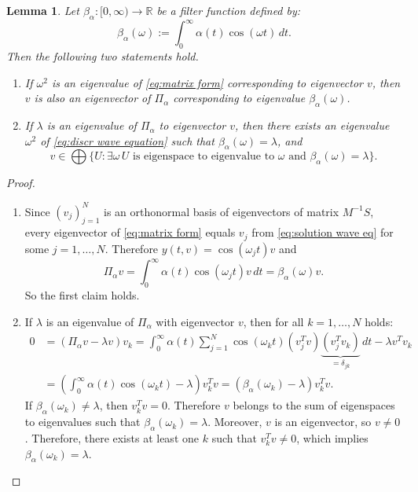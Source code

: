 \documentclass[a4paper,11pt,bibliography=totoc,listof=totoc,headinclude=true,cleardoublepage=empty,oneside]{scrbook}
\newtheorem{lemma}[theorem]{Lemma}
\newcommand{\R}{\mathbb{R}}
\begin{document}
\begin{lemma}
    Let $\beta_\alpha : [0, \infty) \rightarrow \R$ be a filter function defined by:
    \begin{equation}\label{eq:cont filter function}
        \beta_\alpha(\omega) := \int_0^\infty \alpha(t) \cos(\omega t) \,dt. 
    \end{equation}
    Then the following two statements hold.
    \begin{enumerate}
        \item If $\omega^2$ is an eigenvalue of \eqref{eq:matrix form} corresponding to eigenvector $v$, then $v$ is also an eigenvector of $\Pi_\alpha$ corresponding to eigenvalue $\beta_\alpha(\omega)$. 
        \item If $\lambda$ is an eigenvalue of $\Pi_\alpha$ to eigenvector $v$, then there exists an eigenvalue $\omega^2$ of \eqref{eq:discr wave equation} such that $\beta_\alpha (\omega) = \lambda$, and 
        \begin{equation*}
            v \in \bigoplus\{ U : \exists \omega \, U \text{ is eigenspace to eigenvalue to } \omega \text{ and } \beta_\alpha(\omega) = \lambda\}.
        \end{equation*}
    \end{enumerate}
\end{lemma}
\begin{proof}
    \begin{enumerate}
        \item Since $(v_j)_{j=1}^N$ is an orthonormal basis of eigenvectors of matrix $M^{-1}S$, every eigenvector of \eqref{eq:matrix form} equals $v_j$ from \eqref{eq:solution wave eq} for some $j=1, \dots, N$. Therefore $y(t, v) = \cos(\omega_j t)v$ and 
        \begin{equation*}
            \Pi_\alpha v = \int_0^\infty \alpha(t) \cos(\omega_j t) v \, dt = \beta_\alpha(\omega) v.
        \end{equation*}
        So the first claim holds.
        \item If $\lambda$ is an eigenvalue of $\Pi_\alpha$ with eigenvector $v$, then for all $k=1, \dots, N$ holds:
        \begin{align*}
             0 &= (\Pi_\alpha v - \lambda v)v_k = \int_0^\infty \alpha(t) \sum_{j=1}^N \cos(\omega_k t) (v_j^T v)\underbrace{(v_j^T v_k)}_{=\delta_{jk}} \, dt - \lambda v^Tv_k \\ &= \left(\int_0^\infty \alpha(t) \cos(\omega_kt) - \lambda \right)v_k^T v = (\beta_\alpha(\omega_k) - \lambda)v_k^T v.
        \end{align*}
        If $\beta_\alpha (\omega_k)\neq \lambda$, then $v_k^Tv = 0$. Therefore $v$ belongs to the sum of eigenspaces to eigenvalues such that $\beta_\alpha(\omega_k) = \lambda$. Moreover, $v$ is an eigenvector, so $v\neq 0$. Therefore, there exists at least one $k$ such that $v_k^T v \neq 0$, which implies $\beta_\alpha (\omega_k) = \lambda$. 
    \end{enumerate}
\end{proof}
\end{document}
